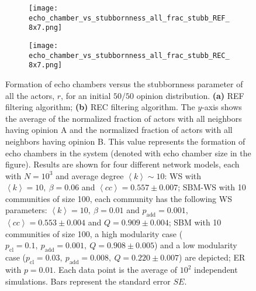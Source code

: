 \documentclass[11 pt , letterpaper , twoside , openright]{book}
\begin{document}
\begin{figure}[H]
  \begin{subfigure}[b]{0.49\textwidth}
    \caption{}
  	\texttt{[image: echo\_chamber\_vs\_stubbornness\_all\_frac\_stubb\_REF\_8x7.png]}
    \label{REF_all_frac_stubb}
  \end{subfigure}
  \begin{subfigure}[b]{0.49\textwidth}
    \caption{}
  	\texttt{[image: echo\_chamber\_vs\_stubbornness\_all\_frac\_stubb\_REC\_8x7.png]}
    \label{REC_all_frac_stubb}
  \end{subfigure}
  \captionsetup{format=plain}
  \caption[Formation of echo chambers versus the stubbornness parameter of all the actors, $r$, for the REF and REC filtering algorithms and an initial $50/50$ opinion distribution.]{Formation of echo chambers versus the stubbornness parameter of all the actors, $r$, for an initial $50/50$ opinion distribution. \textbf{(a)} REF filtering algorithm; \textbf{(b)} REC filtering algorithm. The $y$-axis shows the average of the normalized fraction of actors with all neighbors having opinion A and the normalized fraction of actors with all neighbors having opinion B. This value represents the formation of echo chambers in the system (denoted with echo chamber size in the figure). Results are shown for four different network models, each with $N=10^3$ and average degree $\left<k\right> \sim 10$: WS with $\left<k\right> =10,\ \beta = 0.06$ and $\left<cc\right> = 0.557 \pm 0.007$; SBM-WS with 10 communities of size 100, each community has the following WS parameters: $\left<k\right> = 10,\ \beta = 0.01$ and $p_{\text{add}} = 0.001$, $\left<cc\right> = 0.553 \pm 0.004$ and $Q = 0.909 \pm 0.004$; SBM with 10 communities of size 100, a high modularity case ($p_{\text{cl}} = 0.1,\ p_{\text{add}} = 0.001,\ Q = 0.908 \pm 0.005$) and a low modularity case ($p_{\text{cl}} = 0.03,\ p_{\text{add}} = 0.008,\ Q = 0.220 \pm 0.007$) are depicted; ER with $p= 0.01$. Each data point is the average of $10^2$ independent simulations. Bars represent the standard error $SE$.}
\label{echo_vs_all_frac_stubb_REF-REC}
\end{figure}
\noindent
\end{document}
